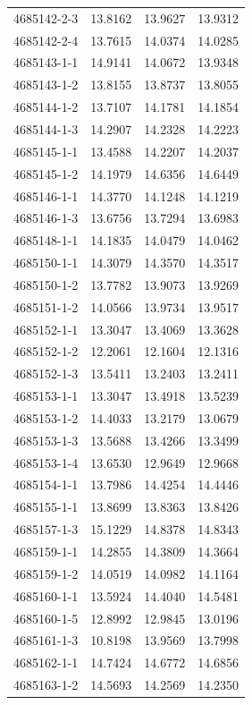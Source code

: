 \begin{longtable}{lrrr}
4685142-2-3 & 13.8162 & 13.9627 & 13.9312 \\
4685142-2-4 & 13.7615 & 14.0374 & 14.0285 \\
4685143-1-1 & 14.9141 & 14.0672 & 13.9348 \\
4685143-1-2 & 13.8155 & 13.8737 & 13.8055 \\
4685144-1-2 & 13.7107 & 14.1781 & 14.1854 \\
4685144-1-3 & 14.2907 & 14.2328 & 14.2223 \\
4685145-1-1 & 13.4588 & 14.2207 & 14.2037 \\
4685145-1-2 & 14.1979 & 14.6356 & 14.6449 \\
4685146-1-1 & 14.3770 & 14.1248 & 14.1219 \\
4685146-1-3 & 13.6756 & 13.7294 & 13.6983 \\
4685148-1-1 & 14.1835 & 14.0479 & 14.0462 \\
4685150-1-1 & 14.3079 & 14.3570 & 14.3517 \\
4685150-1-2 & 13.7782 & 13.9073 & 13.9269 \\
4685151-1-2 & 14.0566 & 13.9734 & 13.9517 \\
4685152-1-1 & 13.3047 & 13.4069 & 13.3628 \\
4685152-1-2 & 12.2061 & 12.1604 & 12.1316 \\
4685152-1-3 & 13.5411 & 13.2403 & 13.2411 \\
4685153-1-1 & 13.3047 & 13.4918 & 13.5239 \\
4685153-1-2 & 14.4033 & 13.2179 & 13.0679 \\
4685153-1-3 & 13.5688 & 13.4266 & 13.3499 \\
4685153-1-4 & 13.6530 & 12.9649 & 12.9668 \\
4685154-1-1 & 13.7986 & 14.4254 & 14.4446 \\
4685155-1-1 & 13.8699 & 13.8363 & 13.8426 \\
4685157-1-3 & 15.1229 & 14.8378 & 14.8343 \\
4685159-1-1 & 14.2855 & 14.3809 & 14.3664 \\
4685159-1-2 & 14.0519 & 14.0982 & 14.1164 \\
4685160-1-1 & 13.5924 & 14.4040 & 14.5481 \\
4685160-1-5 & 12.8992 & 12.9845 & 13.0196 \\
4685161-1-3 & 10.8198 & 13.9569 & 13.7998 \\
4685162-1-1 & 14.7424 & 14.6772 & 14.6856 \\
4685163-1-2 & 14.5693 & 14.2569 & 14.2350 \\

\end{longtable}

